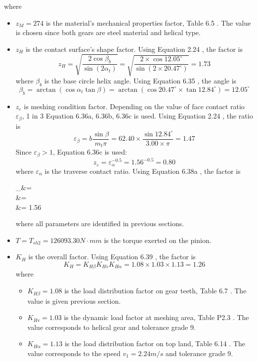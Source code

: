 where
\begin{itemize}
	\item $ z_M = 274 $ is the material's mechanical properties factor, Table 6.5 \cite{tk1}. The value is chosen since both gears are steel material and helical type.
	\item $ z_H $ is the contact surface's shape factor. Using Equation 2.24 \cite{tk1}, the factor is
	\[ z_H = \sqrt{\dfrac{2\cos\beta_b}{\sin(2\alpha_t)}} = \sqrt{\dfrac{2\times\cos 12.05^\circ}{\sin(2\times 20.47^\circ)}} = 1.73\]
	where $ \beta_b $ is the base circle helix angle. Using Equation 6.35 \cite{tk1}, the angle is
	\[ \beta_b = \arctan\left( \cos\alpha_t\tan\beta\right) = \arctan\left( \cos 20.47^\circ \times \tan 12.84^\circ\right) = 12.05^\circ\]
	\item $ z_\varepsilon $ is meshing condition factor. Depending on the value of face contact ratio $ \varepsilon_\beta $, 1 in 3 Equation 6.36a, 6.36b, 6.36c \cite{tk1} is used. Using Equation 2.24 \cite{tk1}, the ratio is
	\[\varepsilon_\beta = b\dfrac{\sin\beta}{m_t\pi} = 62.40\times\dfrac{\sin 12.84^\circ}{3.00\times\pi}=1.47\]
	Since $ \varepsilon_\beta >1 $, Equation 6.36c \cite{tk1} is used:
	\[z_\varepsilon = \varepsilon_\alpha^{-0.5} = 1.56^{-0.5} = 0.80\]	
	where $ \varepsilon_\alpha $ is the traverse contact ratio. Using Equation 6.38a \cite{tk1}, the factor is
	\begin{flalign*}
	\varepsilon_\alpha &= \\
	&= \\
	&= 1.56
	\end{flalign*}
	where all parameters are identified in previous sections.
	\item $ T=T_{sh2}=126093.30\unit{N\cdot mm} $ is the torque exerted on the pinion.
	\item $ K_H $ is the overall factor. Using Equation 6.39 \cite{tk1}, the factor is
	\[ K_H = K_{H\beta}K_{Hv}K_{H\alpha} = 1.08\times 1.03 \times 1.13  = 1.26\]
	where
	\begin{itemize}
		\item $ K_{H\beta} = 1.08 $ is the load distribution factor on gear teeth, Table 6.7 \cite{tk1}. The value is given previous section.
		\item $ K_{Hv} = 1.03 $ is the dynamic load factor at meshing area, Table P2.3 \cite{tk1}. The value corresponds to helical gear and tolerance grade 9.
		\item $ K_{H\alpha} = 1.13 $ is the load distribution factor on top land, Table 6.14 \cite{tk1}. The value corresponds to the speed $ v_1=2.24\unit{m/s} $ and tolerance grade 9.
	\end{itemize}
\end{itemize}


